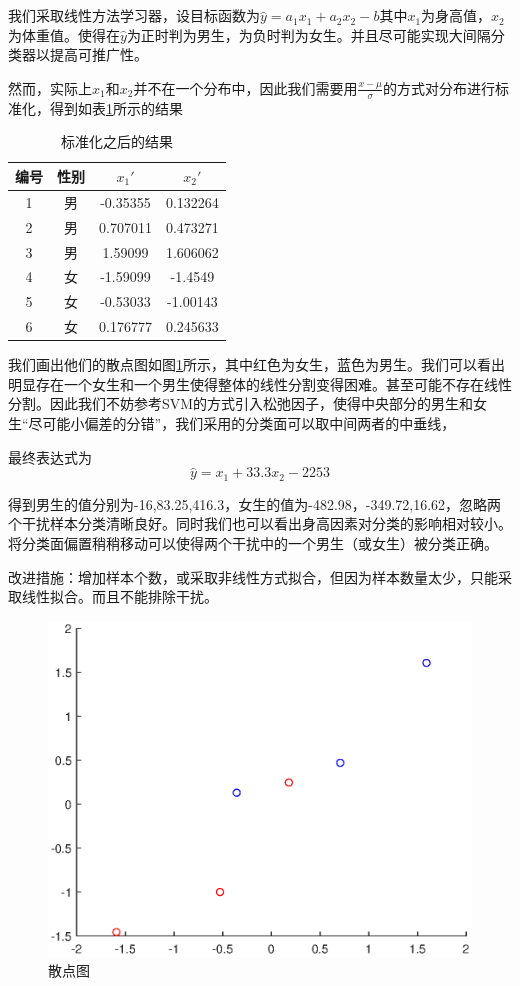 \documentclass[UTF8,a4paper]{paper}
\begin{document}
\section{}
我们采取线性方法学习器，设目标函数为$\hat{y}=a_1x_1+a_2x_2-b$其中$x_1$为身高值，$x_2$为体重值。使得在$\hat{y}$为正时判为男生，为负时判为女生。并且尽可能实现大间隔分类器以提高可推广性。

然而，实际上$x_1$和$x_2$并不在一个分布中，因此我们需要用$\frac{x-\mu}{\sigma}$的方式对分布进行标准化，得到如表\ref{t1}所示的结果

\begin{table}
\centering
\caption{标准化之后的结果}
\label{t1}
\begin{tabular}{|c|c|c|c|}
\hline
编号 & 性别 & $x_1'$ & $x_2'$ \\
\hline 
1 & 男 & -0.35355 & 0.132264 \\
2 & 男 & 0.707011 & 0.473271 \\
3 & 男 & 1.59099 & 1.606062 \\
4 & 女 & -1.59099 & -1.4549 \\
5 & 女 & -0.53033 & -1.00143 \\
6 & 女 & 0.176777 & 0.245633\\
\hline
\end{tabular}
\end{table}
我们画出他们的散点图如图\ref{f4}所示，其中红色为女生，蓝色为男生。我们可以看出明显存在一个女生和一个男生使得整体的线性分割变得困难。甚至可能不存在线性分割。因此我们不妨参考SVM的方式引入松弛因子，使得中央部分的男生和女生“尽可能小偏差的分错”，我们采用的分类面可以取中间两者的中垂线，

最终表达式为$$\hat{y} = x_1+33.3x_2-2253$$

得到男生的值分别为-16,83.25,416.3，女生的值为-482.98，-349.72,16.62，忽略两个干扰样本分类清晰良好。同时我们也可以看出身高因素对分类的影响相对较小。将分类面偏置稍稍移动可以使得两个干扰中的一个男生（或女生）被分类正确。

改进措施：增加样本个数，或采取非线性方式拟合，但因为样本数量太少，只能采取线性拟合。而且不能排除干扰。
\begin{figure}
\centering
\includegraphics[width=\textwidth]{1.eps}
\caption{散点图}
\label{f4}
\end{figure}
\end{document}
